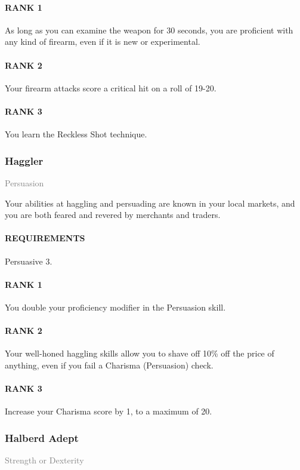 \paragraph{RANK 1} As long as you can examine the weapon for 30 seconds, you are proficient with any kind of firearm, even if it is new or experimental.
\paragraph{RANK 2} Your firearm attacks score a critical hit on a roll of 19-20.
\paragraph{RANK 3} You learn the Reckless Shot technique.

\subsubsection{Haggler} \label{tal::haggler}
\small{\textcolor{gray}{Persuasion}}

\normalsize
Your abilities at haggling and persuading are known in your local markets, and you are both feared and revered by merchants and traders.
\paragraph{REQUIREMENTS} Persuasive 3.
\paragraph{RANK 1} You double your proficiency modifier in the Persuasion skill.
\paragraph{RANK 2} Your well-honed haggling skills allow you to shave off 10\% off the price of anything, even if you fail a Charisma (Persuasion) check.
\paragraph{RANK 3} Increase your Charisma score by 1, to a maximum of 20.

\subsubsection{Halberd Adept} \label{tal::halberdadept}
\small{\textcolor{gray}{Strength or Dexterity}}

